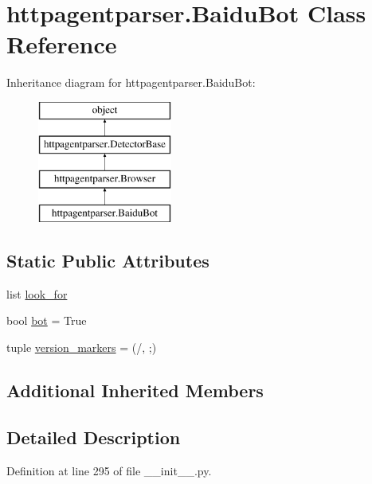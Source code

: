 \hypertarget{classhttpagentparser_1_1_baidu_bot}{}\section{httpagentparser.\+Baidu\+Bot Class Reference}
\label{classhttpagentparser_1_1_baidu_bot}
Inheritance diagram for httpagentparser.\+Baidu\+Bot\+:\begin{figure}[H]
\begin{center}
\leavevmode
\includegraphics[height=4.000000cm]{classhttpagentparser_1_1_baidu_bot}
\end{center}
\end{figure}
\subsection*{Static Public Attributes}
\begin{DoxyCompactItemize}
\item 
list \hyperlink{classhttpagentparser_1_1_baidu_bot_a3d7ac151fa1fb5ee3044041d8153f870}{look\+\_\+for}
\item 
bool \hyperlink{classhttpagentparser_1_1_baidu_bot_a2dfc73ab20ad2f4a6b3acac5cdc44d47}{bot} = True
\item 
tuple \hyperlink{classhttpagentparser_1_1_baidu_bot_ab97a54f416373ce453a45a92223989d6}{version\+\_\+markers} = (\textquotesingle{}/\textquotesingle{}, \textquotesingle{};\textquotesingle{})
\end{DoxyCompactItemize}
\subsection*{Additional Inherited Members}


\subsection{Detailed Description}


Definition at line 295 of file \+\_\+\+\_\+init\+\_\+\+\_\+.\+py.



